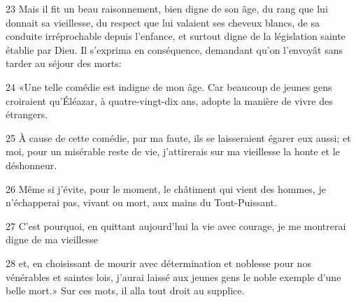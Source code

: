 
23 Mais il fit un beau raisonnement, bien digne de son âge, du rang que lui donnait sa vieillesse, du respect que lui valaient ses cheveux blancs, de sa conduite irréprochable depuis l’enfance, et surtout digne de la législation sainte établie par Dieu. Il s’exprima en conséquence, demandant qu’on l’envoyât sans tarder au séjour des morts:

24 «Une telle comédie est indigne de mon âge. Car beaucoup de jeunes gens croiraient qu’Éléazar, à quatre-vingt-dix ans, adopte la manière de vivre des étrangers.

25 À cause de cette comédie, par ma faute, ils se laisseraient égarer eux aussi; et moi, pour un misérable reste de vie, j’attirerais sur ma vieillesse la honte et le déshonneur.

26 Même si j’évite, pour le moment, le châtiment qui vient des hommes, je n’échapperai pas, vivant ou mort, aux mains du Tout-Puissant.

27 C’est pourquoi, en quittant aujourd’hui la vie avec courage, je me montrerai digne de ma vieillesse

28 et, en choisissant de mourir avec détermination et noblesse pour nos vénérables et saintes lois, j’aurai laissé aux jeunes gens le noble exemple d’une belle mort.» Sur ces mots, il alla tout droit au supplice.